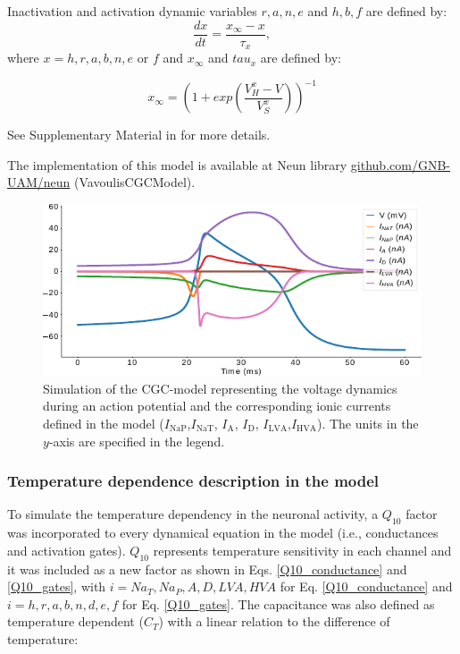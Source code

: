 Inactivation and activation dynamic variables $r,a,n,e$ and $h,b,f$ are defined by:
\begin{equation}
\frac{dx}{dt} = \frac{x_{\infty}-x}{\tau_x},
\end{equation}
where $x = h,r,a,b,n,e$ or $f$ and $x_{\infty}$ and $tau_x$ are defined by:

\begin{equation}
x_{\infty} = {(1+exp(\frac{V_H^x-V}{V_S^x}))}^{-1}
\end{equation}

See Supplementary Material in \textcite{vavoulis_balanced_2010} for more details. 

The implementation of this model is available at Neun library \href{https://github.com/GNB-UAM/neun}{github.com/GNB-UAM/neun} (VavoulisCGCModel).

\begin{figure}[htb!]
	\centering
	\includegraphics[width=\textwidth]{img/laser/cgc-model-simulation.pdf}
	\caption{Simulation of the CGC-model representing the voltage dynamics during an action potential and the corresponding ionic currents defined in the model ($I_{\textrm{NaP}}$,$I_{\textrm{NaT}}$, $I_{\textrm{A}}$, $I_{\textrm{D}}$, $I_{\textrm{LVA}}$,$I_{\textrm{HVA}}$). The units in the $y$-axis are specified in the legend.}
	\label{fig:model cgc currents}
\end{figure}


\subsubsection{Temperature dependence description in the model}
\label{sec:model equations temperature}
To simulate the temperature dependency in the neuronal activity, a $Q_{10}$ factor was incorporated to every dynamical equation in the model (i.e., conductances and activation gates). $Q_{10}$ represents temperature sensitivity in each channel and it was included as a new factor as shown in Eqs. \ref{Q10_conductance} and \ref{Q10_gates}, with $i=Na_T,Na_P,A,D,LVA,HVA$ for Eq. \ref{Q10_conductance} and $i=h,r,a,b,n,d,e,f$ for Eq. \ref{Q10_gates}. The capacitance was also defined as temperature dependent ($C_T$) with a linear relation to the difference of temperature: 

